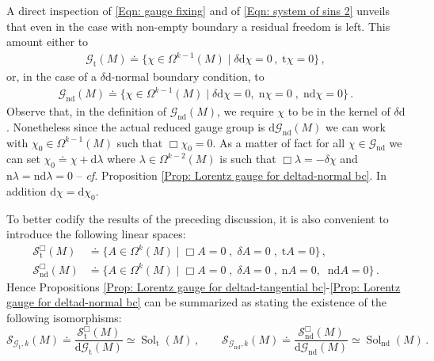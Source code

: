 A direct inspection of \eqref{Eqn: gauge fixing} and of \eqref{Eqn: system of sins 2} unveils that even in the case with non-empty boundary a residual freedom is left.
	This amount either to 
	\begin{align*}
	\mathcal{G}_{\mathrm{t}}(M)\doteq
	\{\chi\in\Omega^{k-1}(M)\;|\;\delta\mathrm{d}\chi=0\,,\;\mathrm{t}\chi=0\}\,,
	\end{align*}
	or, in the case of a $\delta\mathrm{d}$-normal boundary condition, to
	\begin{align}\label{Eqn: residual gauge nd}
	\mathcal{G}_{\mathrm{nd}}(M)\doteq
	\{\chi\in\Omega^{k-1}(M)\;|\;\delta\mathrm{d}\chi=0,\;\mathrm{n}\chi=0\;,\;\mathrm{n}\mathrm{d}\chi=0\}\,.
	\end{align}
	Observe that, in the definition of $\mathcal{G}_{\mathrm{nd}}(M)$, we require $\chi$ to be in the kernel of $\delta\mathrm{d}$.
	Nonetheless
	since the actual reduced gauge group is $\mathrm{d}\mathcal{G}_{\mathrm{nd}}(M)$ we can work with $\chi_0\in\Omega^{k-1}(M)$ such that $\Box\chi_0=0$.
	As a matter of fact for all $\chi\in\mathcal{G}_{\mathrm{nd}}$ we can set $\chi_0\doteq\chi+\mathrm{d}\lambda$ where $\lambda\in\Omega^{k-2}(M)$ is such that $\Box\lambda=-\delta\chi$ and $\mathrm{n}\lambda=\mathrm{nd}\lambda=0$ -- \textit{cf.} Proposition \ref{Prop: Lorentz gauge for deltad-normal bc}.
	In addition $\mathrm{d}\chi=\mathrm{d}\chi_0$.
	
	To better codify the results of the preceding discussion, it is also convenient to introduce the following linear spaces:
	\begin{align}
	\label{Eqn: gauge fixed solutions with wave-tangential bc}
	\mathcal{S}^\Box_{\mathrm{t}}(M)&\doteq\{A\in\Omega^k(M)\;|\;
	\Box A=0\;,\;\delta A=0\;,\;\mathrm{t}A=0\}\,,\\
	\label{Eqn: gauge fixed solutions with wave-normal bc}
	\mathcal{S}^\Box_{\mathrm{nd}}(M)&\doteq\{A\in\Omega^k(M)\;|\;
	\Box A=0\;,\;\delta A=0\;,\;\mathrm{n}A=0,\;\;\mathrm{nd}A=0\}\,.
	\end{align}
	Hence Propositions \ref{Prop: Lorentz gauge for deltad-tangential bc}-\ref{Prop: Lorentz gauge for deltad-normal bc} can be summarized as stating the existence of the following isomorphisms: 
	\begin{equation}\label{Eqn: Isomorphisms}
	\mathcal{S}_{\mathcal{G}_{\mathrm{t}},k}(M)\doteq
	\frac{\mathcal{S}^\Box_{\mathrm{t}}(M)}{\mathrm{d}\mathcal{G}_{\mathrm{t}}(M)}\simeq
	\operatorname{Sol}_{\mathrm{t}}(M)\,,\qquad
	\mathcal{S}_{\mathcal{G}_{\mathrm{nd}},k}(M)\doteq
	\frac{\mathcal{S}^\Box_{\mathrm{nd}}(M)}{\mathrm{d}\mathcal{G}_{\mathrm{nd}}(M)}\simeq
	\operatorname{Sol}_{\mathrm{nd}}(M)\,.
	\end{equation}
	


